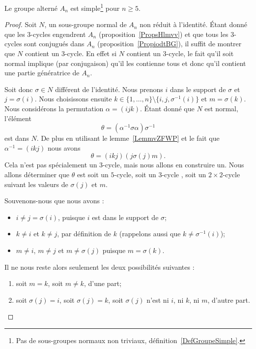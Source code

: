 \begin{theorem} \label{ThoURfSUXP}
	Le groupe alterné \( A_n\) est simple\footnote{Pas de sous-groupes normaux non triviaux, définition~\ref{DefGroupeSimple}.} pour \( n\geq 5\).
\end{theorem}


\begin{proof}
	Soit \( N\), un sous-groupe normal de \( A_n\) non réduit à l'identité. Étant donné que les \( 3\)-cycles engendrent \( A_n\) (proposition~\ref{PropsHlmvv}) et que tous les \( 3\)-cycles sont conjugués dans \( A_n\) (proposition~\ref{PropiodtBG}), il suffit de montrer que \( N\) contient un \( 3\)-cycle. En effet si \( N\) contient un \( 3\)-cycle, le fait qu'il soit normal implique (par conjugaison) qu'il les contienne tous et donc qu'il contient une partie génératrice de \( A_n\).

	Soit donc \( \sigma\in N\) différent de l'identité. Nous prenons \( i\) dans le support de \( \sigma\) et \( j=\sigma(i)\). Nous choisissons ensuite \( k\in\{ 1,\ldots, n \}\setminus\{ i,j,\sigma^{-1}(i) \}\) et \( m=\sigma(k)\). Nous considérons la permutation \( \alpha=(ijk)\). Étant donné que \( N\) est normal, l'élément
	\begin{equation}
		\theta=(\alpha^{-1}\sigma\alpha)\sigma^{-1}
	\end{equation}
	est dans \( N\). De plus en utilisant le lemme~\ref{LemmvZFWP} et le fait que \( \alpha^{-1}=(ikj)\) nous avons
	\begin{equation}
		\theta=(ikj)(j\sigma(j)m).
	\end{equation}
	Cela n'est pas spécialement un \( 3\)-cycle, mais nous allons en construire un. Nous allons déterminer que \( \theta\) est soit un \( 5\)-cycle, soit un \( 3\)-cycle , soit un \( 2\times 2\)-cycle suivant les valeurs de \( \sigma(j)\) et \( m\).

	Souvenons-nous que nous avons :
	\begin{itemize}
		\item
		      \( i \neq j = \sigma(i) \), puisque \( i\) est dans le support de \( \sigma \);
		\item
		      \( k \neq i \) et \( k \neq j \), par définition de \( k\) (rappelons aussi que \( k \neq \sigma^{-1}(i) \));
		\item
		      \( m \neq i \), \( m \neq j \) et \( m \neq  \sigma(j) \) puisque \( m = \sigma(k) \).
	\end{itemize}
	Il ne nous reste alors seulement les deux possibilités suivantes :
	\begin{enumerate}
		\item
		      soit \( m=k\), soit \( m \neq k \), d'une part;
		\item
		      soit \( \sigma(j) = i \), soit \( \sigma(j) = k \), soit \( \sigma(j) \) n'est ni \( i\), ni \( k\), ni \( m\), d'autre part.
	\end{enumerate}


\end{proof}
